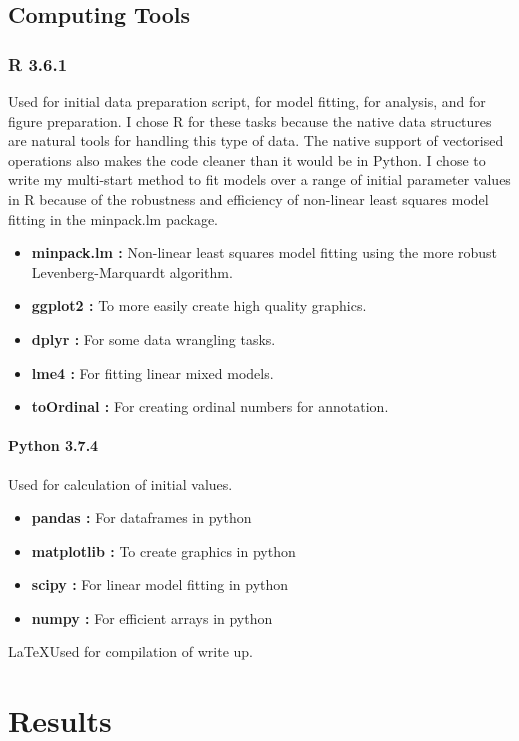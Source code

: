 \documentclass[11pt, a4paper]{article}
\begin{document}
\begin{linenumbers}
\subsection{Computing Tools}
\subsubsection{R 3.6.1 \cite{R}} Used for initial data preparation script, for model fitting, for analysis, and for figure preparation. I chose R for these tasks because the native data structures are natural tools for handling this type of data. The native support of vectorised operations also makes the code cleaner than it would be in Python. I chose to write my multi-start method to fit models over a range of initial parameter values in R because of the robustness and efficiency of non-linear least squares model fitting in the minpack.lm package.
\begin{itemize}
\item \textbf{minpack.lm \cite{minpack}:} Non-linear least squares model fitting using the more robust Levenberg-Marquardt algorithm.
\item \textbf{ggplot2 \cite{gg}:} To more easily create high quality graphics.
\item \textbf{dplyr \cite{dplyr}:} For some data wrangling tasks.
\item \textbf{lme4 \cite{lme4}:} For fitting linear mixed models.
\item \textbf{toOrdinal \cite{tO}:} For creating ordinal numbers for annotation.
\end{itemize}

\paragraph{Python 3.7.4 \cite{python}} Used for calculation of initial values.
\begin{itemize}
\item \textbf{pandas \cite{pd}:} For dataframes in python
\item \textbf{matplotlib \cite{plt}:} To create graphics in python
\item \textbf{scipy \cite{numpy}:} For linear model fitting in python
\item \textbf{numpy \cite{numpy}:} For efficient arrays in python
\end{itemize}

\LaTeX Used for compilation of write up.
\section{Results}


\end{linenumbers}
\end{document}
